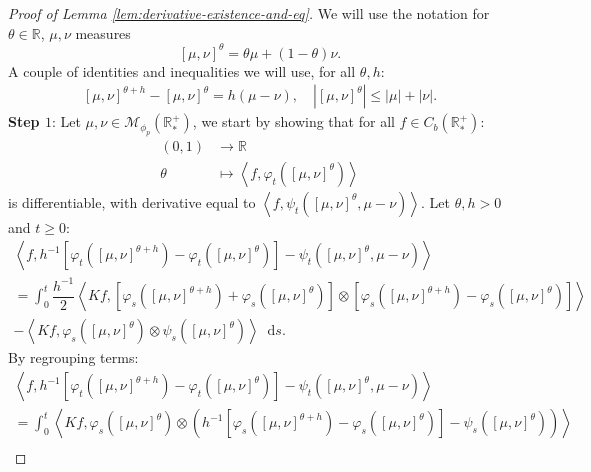 \documentclass[11pt,a4paper]{article}
\newcommand{\RR}{\mathbb{R}}
\newcommand{\RRP}{\mathbb{R}^+_*}
\newcommand{\MC}{\mathcal{M}}
\newcommand{\brac}[1]{\left\langle#1\right\rangle}
\newcommand{\dd}{\mathop{}\!\mathrm{d}}
\begin{document}
\begin{proof}[Proof of Lemma \ref{lem:derivative-existence-and-eq}]
    We will use the notation for $\theta \in \RR$, $\mu,\nu $ measures 
    \[
    \left[\mu,\nu \right]^\theta = \theta\mu + (1-\theta)\nu.
    \]
    A couple of identities and inequalities we will use, for all $\theta, h$:
    \begin{align*}
        \left[\mu,\nu \right]^{\theta+h} - \left[\mu,\nu \right]^{\theta} = h(\mu - \nu),\quad \left|\left[\mu,\nu \right]^{\theta}\right| \leq |\mu| + |\nu|.
    \end{align*}
    \textbf{Step $1$}: Let $\mu,\nu \in \MC_{\phi_{p}}(\RRP)$, we start by showing that for all $f \in C_b(\RRP)$:
    \begin{align*}
        (0,1) &\to \RR \\
        \theta &\mapsto \brac{f,\varphi_t\left(\left[\mu,\nu \right]^\theta\right)}
    \end{align*}
    is differentiable, with derivative equal to $\brac{f,\psi_t\left(\left[\mu,\nu \right]^\theta,\mu-\nu\right)}$. Let $\theta,h > 0$ and $t \geq 0$:
    \begin{multline*}
        \brac{f,h^{-1}\left[\varphi_t\left(\left[\mu,\nu \right]^{\theta+h} \right) - \varphi_t\left(\left[\mu,\nu \right]^{\theta} \right) \right] - \psi_t\left(\left[\mu,\nu \right]^\theta,\mu-\nu\right)} \\
        = \int_0^t \dfrac{h^{-1}}{2}\brac{Kf,\left[\varphi_s\left(\left[\mu,\nu \right]^{\theta+h} \right) + \varphi_s\left(\left[\mu,\nu \right]^{\theta} \right)\right]\otimes \left[\varphi_s\left(\left[\mu,\nu \right]^{\theta+h} \right) - \varphi_s\left(\left[\mu,\nu \right]^{\theta} \right)\right]} \\
        - \brac{Kf,\varphi_s\left(\left[\mu,\nu \right]^{\theta}\right)\otimes \psi_s\left(\left[\mu,\nu \right]^{\theta}\right) }\dd s.
    \end{multline*}
    By regrouping terms:
    \begin{multline*}
        \brac{f,h^{-1}\left[\varphi_t\left(\left[\mu,\nu \right]^{\theta+h} \right) - \varphi_t\left(\left[\mu,\nu \right]^{\theta} \right) \right] - \psi_t\left(\left[\mu,\nu \right]^\theta,\mu-\nu\right)} \\
        = \int_0^t \brac{Kf,\varphi_s\left(\left[\mu,\nu \right]^{\theta} \right)\otimes \left(h^{-1}\left[\varphi_s\left(\left[\mu,\nu \right]^{\theta+h} \right) - \varphi_s\left(\left[\mu,\nu \right]^{\theta} \right)\right] - \psi_s\left(\left[\mu,\nu \right]^{\theta}\right)\right)} \\

\end{multline*}
\end{proof}
\end{document}
